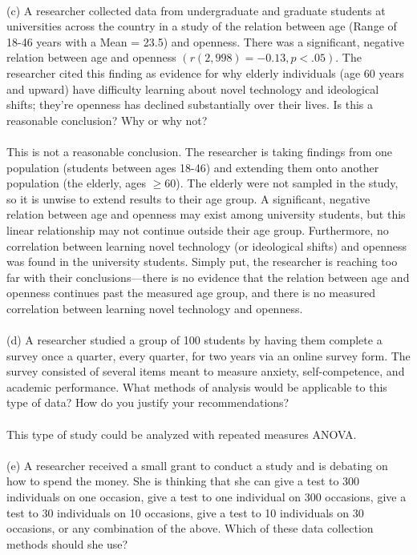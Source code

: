\documentclass[onecolumn,10pt]{jhwhw}
\begin{document}
\\
(c) A researcher collected data from undergraduate and graduate students at universities across the country in a study of the relation between age (Range of 18-46 years with a Mean = 23.5) and openness. There was a significant, negative relation between age and openness $(r(2,998) = -0.13, p < .05)$. The researcher cited this finding as evidence for why elderly individuals (age 60 years and upward) have difficulty learning about novel technology and ideological shifts; they're openness has declined substantially over their lives. Is this a reasonable conclusion? Why or why not?\\
\\
This is not a reasonable conclusion. The researcher is taking findings from one population (students between ages 18-46) and extending them onto another population (the elderly, ages $\geq60$). The elderly were not sampled in the study, so it is unwise to extend results to their age group. A significant, negative relation between age and openness may exist among university students, but this linear relationship may not continue outside their age group. Furthermore, no correlation between learning novel technology (or ideological shifts) and openness was found in the university students. Simply put, the researcher is reaching too far with their conclusions---there is no evidence that the relation between age and openness continues past the measured age group, and there is no measured correlation between learning novel technology and openness.\\
\\
(d) A researcher studied a group of 100 students by having them complete a survey once a quarter, every quarter, for two years via an online survey form. The survey consisted of several items meant to measure anxiety, self-competence, and academic performance. What methods of analysis would be applicable to this type of data? How do you justify your recommendations?\\
\\
This type of study could be analyzed with repeated measures ANOVA.\\
\\
(e) A researcher received a small grant to conduct a study and is debating on how to spend the money. She is thinking that she can give a test to 300 individuals on one occasion, give a test to one individual on 300 occasions, give a test to 30 individuals on 10 occasions, give a test to 10 individuals on 30 occasions, or any combination of the above. Which of these data collection methods should she use?\\
\end{document}
